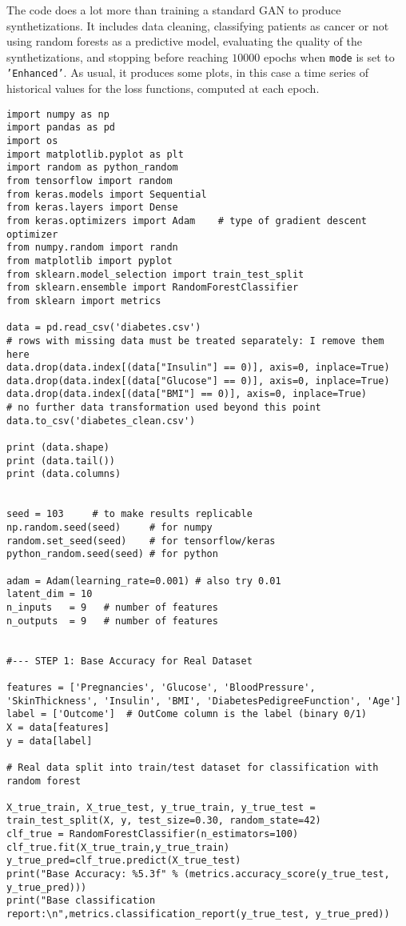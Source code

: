 \documentclass[oneside,10pt]{book}
\begin{document}
The code does a lot more than training a standard GAN to produce synthetizations. It includes data cleaning, classifying patients as cancer or not  using random forests as a predictive model, evaluating the quality of the synthetizations, and stopping before reaching $\num{10000}$
epochs  when \texttt{mode} is set to \texttt{'Enhanced'}. As usual, it produces some plots, in this case a time series of historical values for the loss functions, computed at each \textcolor{index}{epoch}. \vspace{1ex}

\begin{lstlisting}
import numpy as np
import pandas as pd
import os
import matplotlib.pyplot as plt
import random as python_random
from tensorflow import random
from keras.models import Sequential
from keras.layers import Dense
from keras.optimizers import Adam    # type of gradient descent optimizer
from numpy.random import randn
from matplotlib import pyplot
from sklearn.model_selection import train_test_split
from sklearn.ensemble import RandomForestClassifier
from sklearn import metrics

data = pd.read_csv('diabetes.csv')
# rows with missing data must be treated separately: I remove them here
data.drop(data.index[(data["Insulin"] == 0)], axis=0, inplace=True) 
data.drop(data.index[(data["Glucose"] == 0)], axis=0, inplace=True) 
data.drop(data.index[(data["BMI"] == 0)], axis=0, inplace=True) 
# no further data transformation used beyond this point
data.to_csv('diabetes_clean.csv')

print (data.shape)
print (data.tail())
print (data.columns)


seed = 103     # to make results replicable
np.random.seed(seed)     # for numpy
random.set_seed(seed)    # for tensorflow/keras
python_random.seed(seed) # for python

adam = Adam(learning_rate=0.001) # also try 0.01
latent_dim = 10
n_inputs   = 9   # number of features
n_outputs  = 9   # number of features


#--- STEP 1: Base Accuracy for Real Dataset

features = ['Pregnancies', 'Glucose', 'BloodPressure', 'SkinThickness', 'Insulin', 'BMI', 'DiabetesPedigreeFunction', 'Age']
label = ['Outcome']  # OutCome column is the label (binary 0/1) 
X = data[features]
y = data[label] 

# Real data split into train/test dataset for classification with random forest

X_true_train, X_true_test, y_true_train, y_true_test = train_test_split(X, y, test_size=0.30, random_state=42)
clf_true = RandomForestClassifier(n_estimators=100)
clf_true.fit(X_true_train,y_true_train)
y_true_pred=clf_true.predict(X_true_test)
print("Base Accuracy: %5.3f" % (metrics.accuracy_score(y_true_test, y_true_pred)))
print("Base classification report:\n",metrics.classification_report(y_true_test, y_true_pred))



\end{lstlisting}
\end{document}
